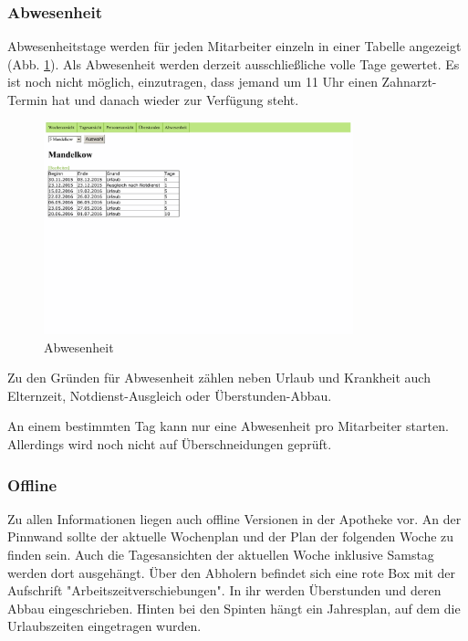 \documentclass[10pt,a4paper,titlepage,oneside]{article}
\begin{document}
\subsubsection{Abwesenheit}
Abwesenheitstage werden für jeden Mitarbeiter einzeln in einer Tabelle angezeigt (Abb. \ref{fig:Abwesenheit}).
Als Abwesenheit werden derzeit ausschließliche volle Tage gewertet. Es ist noch nicht möglich, einzutragen, dass jemand um 11 Uhr einen Zahnarzt-Termin hat und danach wieder zur Verfügung steht.

\begin{figure}[h]
\centering
\includegraphics[width=0.8\textwidth]{abwesenheit-out}
\caption{Abwesenheit}
\label{fig:Abwesenheit}
\end{figure}

Zu den Gründen für Abwesenheit zählen neben Urlaub und Krankheit auch Elternzeit, Notdienst-Ausgleich oder Überstunden-Abbau.

An einem bestimmten Tag kann nur eine Abwesenheit pro Mitarbeiter starten. Allerdings wird noch nicht auf Überschneidungen geprüft.




\subsubsection{Offline}
Zu allen Informationen liegen auch offline Versionen in der Apotheke vor.
An der Pinnwand sollte der aktuelle Wochenplan und der Plan der folgenden Woche zu finden sein. Auch die Tagesansichten der aktuellen Woche inklusive Samstag werden dort ausgehängt. Über den Abholern befindet sich eine rote Box mit der Aufschrift "Arbeitszeitverschiebungen". In ihr werden Überstunden und deren Abbau eingeschrieben.
Hinten bei den Spinten hängt ein Jahresplan, auf dem die Urlaubszeiten eingetragen wurden.
\end{document}
